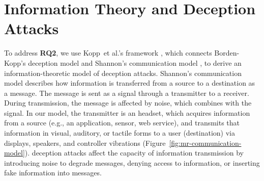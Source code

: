 \section{Information Theory and Deception Attacks}

\label{sec:information-theoretic}

 To address \textbf{RQ2}, we use Kopp~et al.'s framework \cite{kopp:2018}, which connects Borden-Kopp's deception model \cite{brumley:2012} and Shannon's communication model \cite{shannon1948mathematical}, to derive an information-theoretic model of \MR deception attacks. %
Shannon's communication model describes how information is transferred from a source to a destination as a message.
The message is sent as a signal through a transmitter to a receiver.
During transmission, the message is affected by noise, which combines with the signal.
In our model, the transmitter is an \MR headset, which acquires information from a source (e.g., an application, sensor, web service), and transmits that information in visual, auditory, or tactile forms to a user (destination) via displays, speakers, and controller vibrations (Figure~\ref{fig:mr-communication-model}).
\MR deception attacks affect the capacity of information transmission by introducing noise to degrade messages, denying access to information, or inserting fake information into messages.

